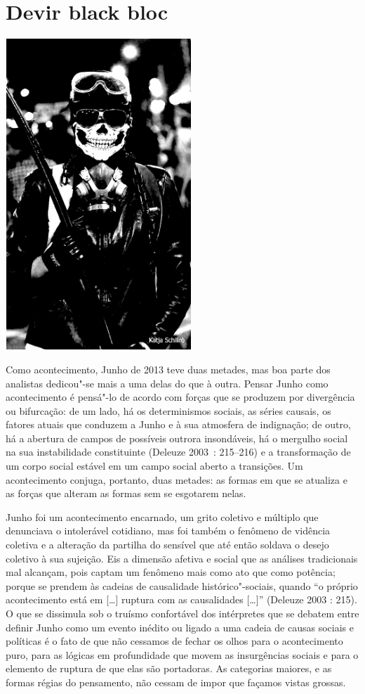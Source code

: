 \chapter{Devir black bloc}

\begin{center}
\includegraphics[width=7cm,height=11.7cm]{Imgs/img12.jpg}
\end{center}

Como acontecimento, Junho de 2013 teve duas metades, mas boa parte dos
analistas dedicou"-se mais a uma delas do que à outra. Pensar Junho como
acontecimento é pensá"-lo de acordo com forças que se produzem por
divergência ou bifurcação: de um lado, há os determinismos sociais, as
séries causais, os fatores atuais que conduzem a Junho e à sua atmosfera
de indignação; de outro, há a abertura de campos de possíveis outrora
insondáveis, há o mergulho social na sua instabilidade constituinte
(Deleuze 2003~: 215--216) e a transformação de um corpo social estável em
um campo social aberto a transições. Um acontecimento conjuga, portanto,
duas metades: as formas em que se atualiza e as forças que alteram as
formas sem se esgotarem nelas.

Junho foi um acontecimento encarnado, um grito coletivo e múltiplo que
denunciava o intolerável cotidiano, mas foi também o fenômeno de
vidência coletiva e a alteração da partilha do sensível que até então
soldava o desejo coletivo à sua sujeição. Eis a dimensão afetiva e
social que as análises tradicionais mal alcançam, pois captam um
fenômeno mais como ato que como potência; porque se prendem às cadeias
de causalidade histórico"-sociais, quando ``o próprio acontecimento está
em {[}\ldots{}{]} ruptura com as causalidades {[}\ldots{}{]}'' (Deleuze 2003
: 215). O que se dissimula sob o truísmo confortável dos intérpretes que
se debatem entre definir Junho como um evento inédito ou ligado a uma
cadeia de causas sociais e políticas é o fato de que não cessamos de
fechar os olhos para o acontecimento puro, para as lógicas em
profundidade que movem as insurgências sociais e para o elemento de
ruptura de que elas são portadoras. As categorias maiores, e as formas
régias do pensamento, não cessam de impor que façamos vistas grossas.

